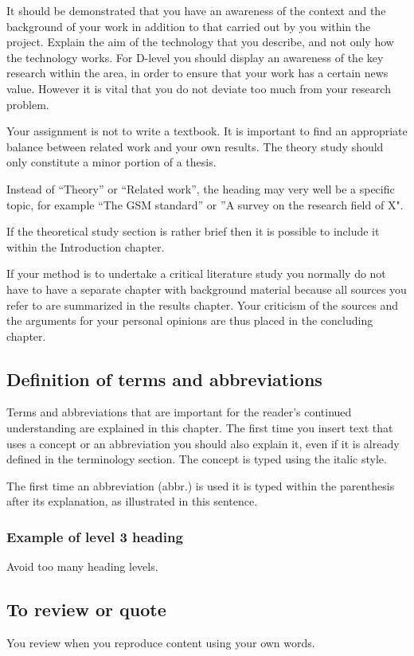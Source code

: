 It should be demonstrated that you have an awareness of the context and the background of your work in addition to that carried out by you within the project. Explain the aim of the technology that you describe, and not only how the technology works. For D-level you should display an awareness of the key research within the area, in order to ensure that your work has a certain news value. However it is vital that you do not deviate too much from your research problem.

Your assignment is not to write a textbook. It is important to find an appropriate balance between related work and your own results. The theory study should only constitute a minor portion of a thesis.

Instead of “Theory” or “Related work”, the heading may very well be a specific topic, for example “The GSM standard” or ”A survey on the research field of X".

If the theoretical study section is rather brief then it is possible to include it within the Introduction chapter.

If your method is to undertake a critical literature study you normally do not have to have a separate chapter with background material because all sources you refer to are summarized in the results chapter. Your criticism of the sources and the arguments for your personal opinions are thus placed in the concluding chapter.

\subsection{Definition of terms and abbreviations}
\label{ch:theory:definitions}
Terms and abbreviations that are important for the reader's continued understanding are explained in this chapter. The first time you insert text that uses a concept or an abbreviation you should also explain it, even if it is already defined in the terminology section. The concept is typed using the italic style.

The first time an abbreviation (abbr.) is used it is typed within the parenthesis after its explanation, as illustrated in this sentence.

\subsubsection{Example of level 3 heading}
\label{ch:theory:level3-heading}
Avoid too many heading levels.

\subsection{To review or quote}
\label{ch:theory:review:quote}
You review when you reproduce content using your own words.

